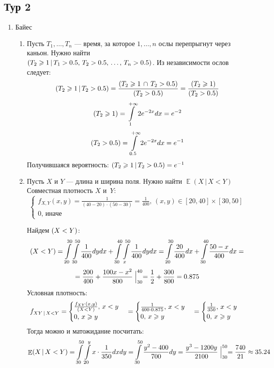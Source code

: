 \documentclass[11pt, a4paper]{article}
\DeclareMathOperator{\E}{\mathbb{E}}
\let\P\relax
\DeclareMathOperator{\P}{\mathbb{P}}
\renewcommand{\ge}{\geqslant}
\theoremstyle{definition}
\begin{document}
\subsection{Тур 2}
\begin{enumerate}
    \item Байес

\begin{enumerate}
    \item Пусть $T_1, \ldots, T_n$ — время, за которое $1, \ldots, n$ ослы перепрыгнут через каньон. Нужно найти\\
    $\P(T_2 \ge 1 \, | \, T_1 > 0.5, \, T_2 > 0.5, \, \ldots, \, T_n > 0.5)$. Из независимости ослов следует:
    \[
    \P(T_2 \ge 1 \, | \, T_2 > 0.5) = \frac{\P(T_2 \ge 1 \, \cap \, T_2 > 0.5)}{\P(T_2 > 0.5)} = \frac{\P(T_2 \ge 1)}{\P(T_2 > 0.5)}
    \]
    \[
    \P(T_2 \ge 1) = \int\limits_1^{+\infty} 2 e^{-2x} dx = e^{-2}
    \]
    \[
    \P(T_2 > 0.5) = \int\limits_{0.5}^{+\infty} 2 e^{-2x} dx = e^{-1}
    \]
    Получившаяся вероятность: $\P(T_2 \ge 1 \, | \, T_2 > 0.5) = e^{-1}$
    
    \item Пусть $X$ и $Y$ — длина и ширина поля. Нужно найти $\E(X \, | \, X < Y)$
    Совместная плотность $X$ и~$Y$:
    \[
    \begin{cases}
    f_{X,Y}(x,y) = \frac{1}{(40-20)\cdot(50-30)} = \frac{1}{400}, \, (x,y) \in [20,40] \times [30,50]\\
    0, \, \text{иначе}
    \end{cases}
    \]
    
    Найдем $\P(X<Y)$:
    \[
    \P(X<Y) = \int\limits_{20}^{30} \int\limits_{30}^{50} \frac{1}{400} dy dx + \int\limits_{30}^{40} \int\limits_{x}^{50} \frac{1}{400} dy dx = \int\limits_{20}^{30} \frac{20}{400} dx + \int\limits_{30}^{40} \frac{50-x}{400} dx = 
    \]
    \[
    = \frac{200}{400} + \frac{100x-x^2}{800} \Bigm|^{40}_{30} = \frac{1}{2} + \frac{300}{800} = 0.875
    \]
    Условная плотность:
    \[
    f_{XY \, | \, X < Y} =
    \begin{cases}
    \frac{f_{XY}(x,y)}{\P(X<Y)}, \, x < y \\
    0, \, x \ge y \\
    \end{cases}
    =
    \begin{cases}
    \frac{1}{400 \cdot 0.875}, \, x < y \\
    0, \, x \ge y \\
    \end{cases}
    =
    \begin{cases}
    \frac{1}{350}, \, x < y \\
    0, \, x \ge y \\
    \end{cases}
    \]
    Тогда можно и матожидание посчитать:
    \[
    \E(X \, | \, X < Y) = \int\limits_{30}^{50} \int\limits_{20}^{y} x \cdot \frac{1}{350} dx dy = \int\limits_{30}^{50} \frac{y^2 - 400}{700} dy = \frac{y^3 - 1200y}{2100} \Bigm|^{50}_{30} = \frac{740}{21} \approx 35.24
    \]
    

\end{enumerate}
\end{enumerate}
\end{document}
